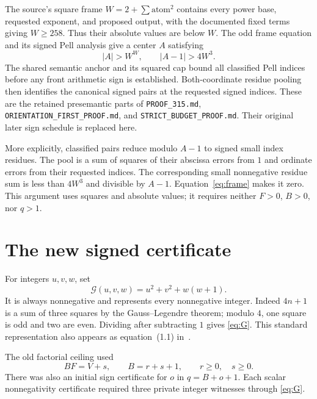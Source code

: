 \documentclass[11pt,letterpaper]{article}
\theoremstyle{remark}\newtheorem{remark}[theorem]{Remark}
\newcommand{\G}{\mathcal G}
\begin{document}
The source's square frame $W=2+\sum \text{atom}^2$ contains every power base, requested exponent, and proposed output, with the documented fixed terms giving $W\ge258$. Thus their absolute values are below $W$. The odd frame equation and its signed Pell analysis give a center $A$ satisfying
\begin{equation}\label{eq:frame}
 |A|>W^W,\qquad |A-1|>4W^3.
\end{equation}
The shared semantic anchor and its squared cap bound all classified Pell indices before any front arithmetic sign is established. Both-coordinate residue pooling then identifies the canonical signed pairs at the requested signed indices. These are the retained presemantic parts of \texttt{PROOF\_315.md}, \texttt{ORIENTATION\_FIRST\_PROOF.md}, and \texttt{STRICT\_BUDGET\_PROOF.md}. Their original later sign schedule is replaced here.

More explicitly, classified pairs reduce modulo $A-1$ to signed small index residues. The pool is a sum of squares of their abscissa errors from $1$ and ordinate errors from their requested indices. The corresponding small nonnegative residue sum is less than $4W^3$ and divisible by $A-1$. Equation~\eqref{eq:frame} makes it zero. This argument uses squares and absolute values; it requires neither $F>0$, $B>0$, nor $q>1$.

\section{The new signed certificate}
\label{sec:certificate}
For integers $u,v,w$, set
\begin{equation}\label{eq:G}
 \G(u,v,w)=u^2+v^2+w(w+1).
\end{equation}
It is always nonnegative and represents every nonnegative integer. Indeed $4n+1$ is a sum of three squares by the Gauss--Legendre theorem; modulo $4$, one square is odd and two are even. Dividing after subtracting $1$ gives \eqref{eq:G}. This standard representation also appears as equation~(1.1) in~\cite{sun}.

The old factorial ceiling used
\begin{equation}\label{eq:old-ceiling}
 BF=V+s,\qquad B=r+s+1,\qquad r\ge0,\quad s\ge0.
\end{equation}
There was also an initial sign certificate for $o$ in $q=B+o+1$. Each scalar nonnegativity certificate required three private integer witnesses through \eqref{eq:G}.
\end{document}
